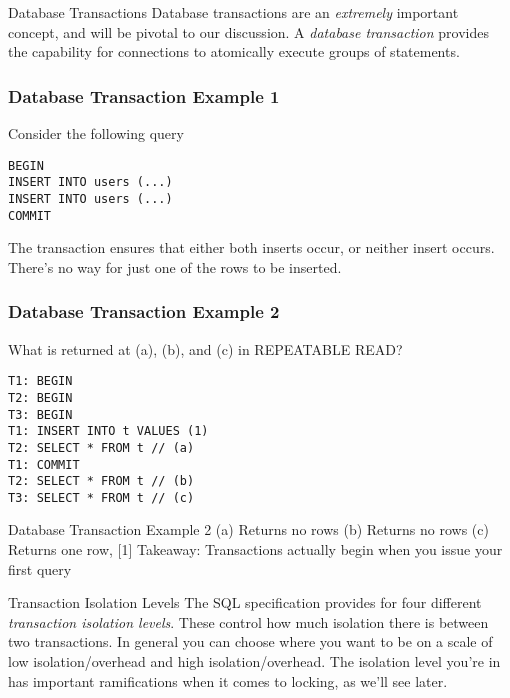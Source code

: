 \documentclass[14pt]{beamer}
\begin{document}
\begin{frame}{Database Transactions}
  Database transactions are an \emph{extremely} important concept, and will be
  pivotal to our discussion.
  \pause
  \newline
  \newline
  A \emph{database transaction} provides the capability for connections to atomically execute groups of statements.
\end{frame}

\begin{frame}[fragile]
  \frametitle{Database Transaction Example 1}
  Consider the following query
  \begin{verbatim}
BEGIN
INSERT INTO users (...)
INSERT INTO users (...)
COMMIT
  \end{verbatim}

  The transaction ensures that either both inserts occur, or neither insert
  occurs. There's no way for just one of the rows to be inserted.
\end{frame}

\begin{frame}[fragile]
  \frametitle{Database Transaction Example 2}
  What is returned at (a), (b), and (c) in REPEATABLE READ?
  \begin{verbatim}
T1: BEGIN
T2: BEGIN
T3: BEGIN
T1: INSERT INTO t VALUES (1)
T2: SELECT * FROM t // (a)
T1: COMMIT
T2: SELECT * FROM t // (b)
T3: SELECT * FROM t // (c)
  \end{verbatim}
\end{frame}

\begin{frame}{Database Transaction Example 2}
(a) Returns no rows
\newline
(b) Returns no rows
\newline
(c) Returns one row, [1]
\newline
Takeaway: Transactions actually begin when you issue your first query
\end{frame}

\begin{frame}{Transaction Isolation Levels}
  The SQL specification provides for four different \emph{transaction isolation
    levels}. These control how much isolation there is between two transactions.
  \newline
  \newline
  In general you can choose where you want to be on a scale of low
  isolation/overhead and high isolation/overhead. The isolation level you're in
  has important ramifications when it comes to locking, as we'll see later.
\end{frame}
\end{document}

